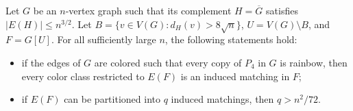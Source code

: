 \documentclass[10pt,a4paper]{amsart}
\begin{document}
\begin{lemma}\label{lem:dense-core}
Let $G$ be an $n$-vertex graph such that its complement $H=\overline G$ satisfies $|E(H)|\le n^{3/2}$.  
Let $B=\{v\in V(G): d_H(v)>8\sqrt n\}$, $U=V(G)\setminus B$, and  $F=G[U].$
For all sufficiently large $n$, the following statements hold:
\begin{itemize}
\item [\rm{(i)}]  if the edges of $G$ are colored such that every copy of $P_4$ in $G$ is rainbow, then every color class restricted to $E(F)$ is an induced matching in $F$;
\item [\rm{(ii)}]  if $E(F)$ can be partitioned into $q$ induced matchings,  then $q> n^2/72$.
\end{itemize}
\end{lemma}
\end{document}
